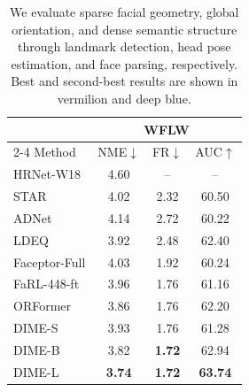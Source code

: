 \documentclass[10pt,journal,compsoc]{IEEEtran}
\newcommand{\BestScore}[1]{\textcolor{DIMEBestText}{#1}}
\newcommand{\SecondScore}[1]{\textcolor{DIMESecondText}{#1}}
\begin{document}
\begin{table}[t]
  \centering
  \setlength{\abovecaptionskip}{2pt}

  \def\GeometryTableFormat{%
    \fontsize{7.6pt}{8.4pt}\selectfont
    \setlength{\tabcolsep}{0.25pt}%
    \renewcommand{\arraystretch}{1.1}%
  }

  \caption{ We evaluate sparse facial geometry, global orientation, and dense semantic structure through landmark detection, head pose estimation, and face parsing, respectively. Best and second-best results are shown in \BestScore{vermilion} and \SecondScore{deep blue}.}
  \label{tab:facial_geometry}
  
  \begin{minipage}[t]{0.250\textwidth}
    \vspace{0pt}
    \centering
    \GeometryTableFormat

    \begin{tabular*}{\linewidth}{
      @{\extracolsep{\fill}}lccc@{}
    }
      \toprule
      & \multicolumn{3}{c}{WFLW \cite{wu2018look}} \\
      \cmidrule(l){2-4}
      Method
      & NME$\downarrow$
      & FR$\downarrow$
      & AUC$\uparrow$ \\
      \midrule
      HRNet-W18 \cite{wang2020deep}
      & 4.60 & -- & -- \\
      STAR \cite{zhou2023star}
      & 4.02 & 2.32 & 60.50 \\
      ADNet \cite{huang2021adnet}
      & 4.14 & 2.72 & 60.22 \\
      LDEQ \cite{micaelli2023recurrence}
      & 3.92 & 2.48 & 62.40 \\
      Faceptor-Full \cite{qin2024faceptor}
      & 4.03 & 1.92 & 60.24 \\
      FaRL-448-ft \cite{zheng2022general}
      & 3.96 & \SecondScore{1.76} & 61.16 \\
      ORFormer \cite{chiang2025orformer}
      & 3.86 & \SecondScore{1.76} & 62.20 \\
      \midrule
      DIME-S
      & 3.93 & \SecondScore{1.76} & 61.28 \\
      DIME-B
      & \SecondScore{3.82}
      & \BestScore{\textbf{1.72}}
      & \SecondScore{62.94} \\
      DIME-L
      & \BestScore{\textbf{3.74}}
      & \BestScore{\textbf{1.72}}
      & \BestScore{\textbf{63.74}} \\
      \bottomrule
    \end{tabular*}


\end{minipage}
\end{table}
\end{document}
